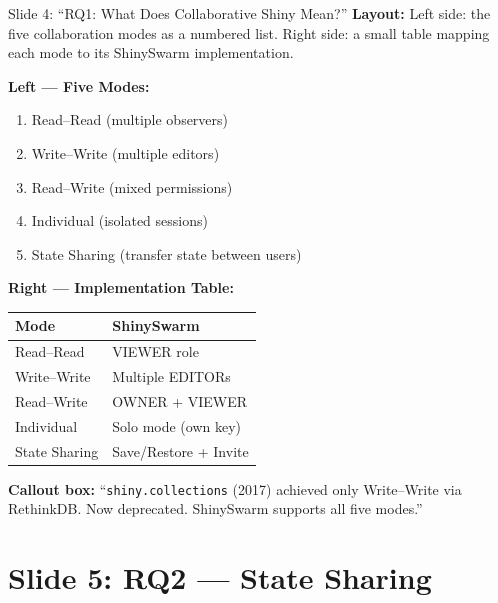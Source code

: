 \documentclass[12pt,a4paper]{article}
\begin{document}
\begin{slidebox}{Slide 4: ``RQ1: What Does Collaborative Shiny Mean?''}
\textbf{Layout:} Left side: the five collaboration modes as a numbered list. Right side: a small table mapping each mode to its ShinySwarm implementation.

\textbf{Left --- Five Modes:}
\begin{enumerate}[nosep]
  \item Read--Read (multiple observers)
  \item Write--Write (multiple editors)
  \item Read--Write (mixed permissions)
  \item Individual (isolated sessions)
  \item State Sharing (transfer state between users)
\end{enumerate}

\textbf{Right --- Implementation Table:}

\begin{tabular}{@{}ll@{}}
\toprule
Mode & ShinySwarm \\
\midrule
Read--Read & VIEWER role \\
Write--Write & Multiple EDITORs \\
Read--Write & OWNER + VIEWER \\
Individual & Solo mode (own key) \\
State Sharing & Save/Restore + Invite \\
\bottomrule
\end{tabular}

\textbf{Callout box:} ``\texttt{shiny.collections} (2017) achieved only Write--Write via RethinkDB. Now deprecated. ShinySwarm supports all five modes.''
\end{slidebox}

\section{Slide 5: RQ2 --- State Sharing}
\end{document}
